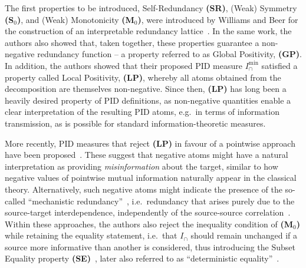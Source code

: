 \documentclass{article}
\newcommand{\ts}[1]{\ensuremath{_{\text{#1}}}}
\newcommand{\Ic}{\ensuremath{I_\cap}\xspace}
\newcommand{\SR}{\textbf{(SR)}\xspace} %
\newcommand{\Sz}{\textbf{(S\ts{0})}\xspace} %
\newcommand{\Mz}{\textbf{(M\ts{0})}\xspace} %
\newcommand{\GP}{\textbf{(GP)}\xspace} %
\newcommand{\SE}{\textbf{(SE)}\xspace} %
\newcommand{\LP}{\textbf{(LP)}\xspace}
\newcommand{\Imin}{\ensuremath{I_\cap^{\text{min}}}\xspace}
\begin{document}
The first properties to be introduced, Self-Redundancy \SR, (Weak) Symmetry \Sz, and (Weak) Monotonicity \Mz, were introduced by Williams and Beer for the construction of an interpretable redundancy lattice~\cite{williams2010nonnegative}. In the same work, the authors also showed that, taken together, these properties guarantee a non-negative redundancy function -- a property referred to as Global Positivity, \GP. 
In addition, the authors showed that their proposed PID measure \Imin satisfied a property called Local Positivity, \LP, whereby all atoms obtained from the decomposition are themselves non-negative. Since then, \LP has long been a heavily desired property of PID definitions, as non-negative quantities enable a clear interpretation of the resulting PID atoms, e.g.\ in terms of information transmission, as is possible for standard information-theoretic measures.


More recently, PID measures that reject \LP in favour of a pointwise approach have been proposed~\cite{finn2018pointwise, makkeh2021introducing}. These suggest that negative atoms might have a natural interpretation as providing \textit{misinformation} about the target, similar to how negative values of pointwise mutual information naturally appear in the classical theory. Alternatively, such negative atoms might indicate the presence of the so-called ``mechanistic redundancy''~\cite{ince2017measuring}, i.e.\ redundancy that arises purely due to the source-target interdependence, independently of the source-source correlation~\cite{harder2013bivariate}. Within these approaches, the authors also reject the inequality condition of \Mz while retaining the equality statement, i.e.\ that $\Ic$ should remain unchanged if a source more informative than another is considered, thus introducing the Subset Equality property \SE~\cite{ince2017measuring}, later also referred to as ``deterministic equality''~\cite{kolchinsky2022novel}.
\end{document}
